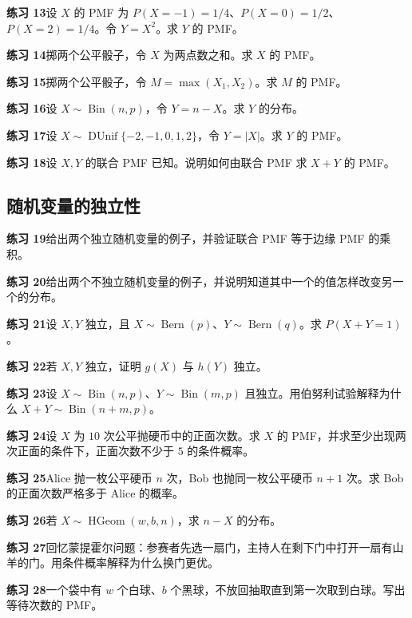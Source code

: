 \documentclass[UTF8,12pt,a4paper,fontset=fandol]{ctexart}
\begin{document}
\noindent\textbf{练习 13}\quad 设 $X$ 的 PMF 为 $P(X=-1)=1/4$、$P(X=0)=1/2$、$P(X=2)=1/4$。令 $Y=X^2$。求 $Y$ 的 PMF。

\noindent\textbf{练习 14}\quad 掷两个公平骰子，令 $X$ 为两点数之和。求 $X$ 的 PMF。

\noindent\textbf{练习 15}\quad 掷两个公平骰子，令 $M=\max(X_1,X_2)$。求 $M$ 的 PMF。

\noindent\textbf{练习 16}\quad 设 $X\sim\operatorname{Bin}(n,p)$，令 $Y=n-X$。求 $Y$ 的分布。

\noindent\textbf{练习 17}\quad 设 $X\sim\operatorname{DUnif}\{-2,-1,0,1,2\}$，令 $Y=|X|$。求 $Y$ 的 PMF。

\noindent\textbf{练习 18}\quad 设 $X,Y$ 的联合 PMF 已知。说明如何由联合 PMF 求 $X+Y$ 的 PMF。

\subsection*{随机变量的独立性}

\noindent\textbf{练习 19}\quad 给出两个独立随机变量的例子，并验证联合 PMF 等于边缘 PMF 的乘积。

\noindent\textbf{练习 20}\quad 给出两个不独立随机变量的例子，并说明知道其中一个的值怎样改变另一个的分布。

\noindent\textbf{练习 21}\quad 设 $X,Y$ 独立，且 $X\sim\operatorname{Bern}(p)$、$Y\sim\operatorname{Bern}(q)$。求 $P(X+Y=1)$。

\noindent\textbf{练习 22}\quad 若 $X,Y$ 独立，证明 $g(X)$ 与 $h(Y)$ 独立。

\noindent\textbf{练习 23}\quad 设 $X\sim\operatorname{Bin}(n,p)$、$Y\sim\operatorname{Bin}(m,p)$ 且独立。用伯努利试验解释为什么 $X+Y\sim\operatorname{Bin}(n+m,p)$。

\noindent\textbf{练习 24}\quad 设 $X$ 为 $10$ 次公平抛硬币中的正面次数。求 $X$ 的 PMF，并求至少出现两次正面的条件下，正面次数不少于 $5$ 的条件概率。

\noindent\textbf{练习 25}\quad Alice 抛一枚公平硬币 $n$ 次，Bob 也抛同一枚公平硬币 $n+1$ 次。求 Bob 的正面次数严格多于 Alice 的概率。

\noindent\textbf{练习 26}\quad 若 $X\sim\operatorname{HGeom}(w,b,n)$，求 $n-X$ 的分布。

\noindent\textbf{练习 27}\quad 回忆蒙提霍尔问题：参赛者先选一扇门，主持人在剩下门中打开一扇有山羊的门。用条件概率解释为什么换门更优。

\noindent\textbf{练习 28}\quad 一个袋中有 $w$ 个白球、$b$ 个黑球，不放回抽取直到第一次取到白球。写出等待次数的 PMF。
\end{document}
